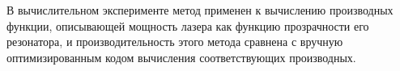 \documentclass[11pt,a4paper]{article}
\begin{document}
В вычислительном эксперименте метод применен к вычислению производных функции,
описывающей мощность лазера как функцию прозрачности его резонатора, и производительность
этого метода сравнена с вручную оптимизированным кодом вычисления соответствующих
производных.

\begin{comment}
Тут на днях писали про аналитическое нахождение производных, что напомнило мне об одной моей маленькой библиотечке на C++, которая делает почти то же, но во время компиляции.



В чём профит? Ответ прост: мне нужно было запрогать нахождение минимума достаточно сложной функции, считать производные этой функции по её параметрам ручкой на бумажке было лень, проверять потом, что я не опечатался при написании кода, и поддерживать этот самый код — лень вдвойне, поэтому было решено написать штуковину, которая это сделает за меня. Ну, чтобы в коде можно было написать что-то такое:

using Formula_t = decltype (k * (_1 - r0) / (_1 + r0) * (g0 / (alpha0 - logr0 / Num<300>) - _1));    // сама формула
const auto residual = Formula_t::Eval (datapoint) - knownValue;    // регрессионный остаток

// производные по параметрам:
const auto dg0 = VarDerivative_t<Formula_t, decltype (g0)>::Eval (datapoint);
const auto dalpha0 = VarDerivative_t<Formula_t, decltype (alpha0)>::Eval (datapoint);
const auto dk = VarDerivative_t<Formula_t, decltype (k)>::Eval (datapoint);

Вместо крокодилов, которые получатся, если брать частные производные функции на картинке вначале (вернее, некоторого её упрощённого варианта, но он выглядит не так страшно).

Ещё неплохо быть достаточно уверенным, что компилятор это соптимизирует так, как если бы соответствующие производные и функции были написаны руками. А уверенным быть бы хотелось — находить минимум нужно было очень много раз (действительно много, где-то от сотни миллионов до миллиарда, в этом была суть некоего вычислительного эксперимента), поэтому вычисление производных было бы бутылочным горлышком, происходи оно во время выполнения через какую-нибудь рекурсию по древообразной структуре. Если же заставить компилятор вычислять производную, собственно, во время компиляции, то есть шанс, что он по получившемуся коду ещё пройдётся оптимизатором, и мы не потеряем по сравнению с ручным выписыванием всех производных. Шанс реализовался, кстати.


\end{comment}
\end{document}
